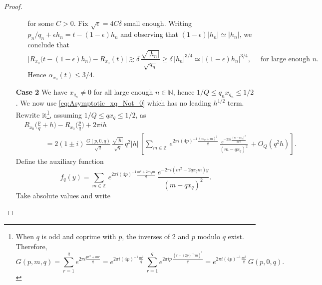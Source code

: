 \documentclass[11pt,reqno]{amsart}
\theoremstyle{definition}
\begin{document}
\begin{proof}
\begin{itemize}
\begin{itemize}
\begin{equation}
\end{equation}
for some $C>0$.
Fix $\sqrt{\epsilon} = 4C \delta$ small enough.
Writing $p_n/q_n + \epsilon h_n = t - (1-\epsilon) h_n$ and observing that $(1-\epsilon)|h_n| \simeq |h_n|$, we conclude that 
\begin{equation}
 \Big| R_{x_0} \big( t - (1- \epsilon) h_n \big)  - R_{x_0}( t ) \Big| 
 \gtrsim \delta \,  \frac{\sqrt{|h_n|}}{\sqrt{q_n}}
 \geq \delta \, |h_n|^{3/4} 
 \simeq | (1-\epsilon) h_n |^{3/4}, 
 \quad \text{ for large enough } n. 
\end{equation}
Hence $\alpha_{x_0}(t) \leq 3/4$. 
 
\end{itemize}
	
	
	\item[\textbf{Case 2}] We have $x_{q_n} \neq 0$ for all large enough $n \in \mathbb N$,
	hence $1/Q \leq q_n x_{q_n} \leq 1/2$. 
	We now use \eqref{eq:Asymptotic_xq_Not_0} which
	has no leading $h^{1/2}$ term. 
	Rewrite it\footnote{
	When $q$ is odd and coprime with $p$, the inverses of 2 and $p$ modulo $q$ exist.
	Therefore, 
	\begin{equation}
	G(p,m,q) = \sum_{r=1}^q e^{2\pi i \frac{pr^2 + mr}{q}}
	= e^{2\pi i (4p)^{-1}\frac{m^2}{q}} \, \sum_{r=1}^q e^{2\pi i p \, \frac{(r + (2p)^{-1}m)^2}{q} } 
	= e^{2\pi i (4p)^{-1}\frac{m^2}{q}} \, G(p,0,q).
	\end{equation}	
	}, %
	assuming $1/Q \leq qx_q \leq 1/2$, 
	as	
	\begin{equation}
	\begin{split}
& R_{x_0}\Big( \frac{p}{q} + h \Big) - R_{x_0}\Big( \frac{p}{q} \Big) + 2\pi i h  \\
& \qquad \quad = 2(1 \pm i) \, \frac{G(p,0,q)}{\sqrt{q}}\, \frac{\sqrt{|h|}}{\sqrt{q}} \,  q^{2} |h| \, \left[  \sum_{m \in \mathbb Z} \, e^{2\pi i (4p)^{-1} \frac{(m_q + m)^2}{q}} \,  
\frac{e^{- 2\pi i \frac{(m - qx_q)^2}{4 q^2 h}}}{ (m - qx_q)^2} \,  + O_Q\left( q^{2} h  \right)
\right].
\end{split}
	\end{equation}
	Define the auxiliary function
	\begin{equation}\label{eq:f_q}
	f_q(y) = \sum_{m \in \mathbb Z} \, e^{2\pi i (4p)^{-1} \frac{ m^2 + 2m_q m}{q}} \,  
\frac{e^{- 2\pi i (m^2  - 2 qx_q m)  y }}{ (m - qx_q)^2}.
	\end{equation}
	Take absolute values and write

\end{itemize}
\end{proof}
\end{document}
